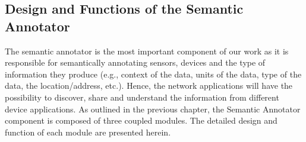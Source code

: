 \begin{table}[htbp]
\centering
{}
\end{table}

\subsection{Design and Functions of the Semantic Annotator}
The semantic annotator is the most important component of our work as it is responsible for semantically annotating sensors, devices and the type of information they produce (e.g., context of the data, units of the data, type of the data, the location/address, etc.). Hence, the network applications will have the possibility to discover, share and understand the information from different device applications. As outlined in the previous chapter, the Semantic Annotator component is composed of three coupled modules. The detailed design and function of each module are presented herein.

